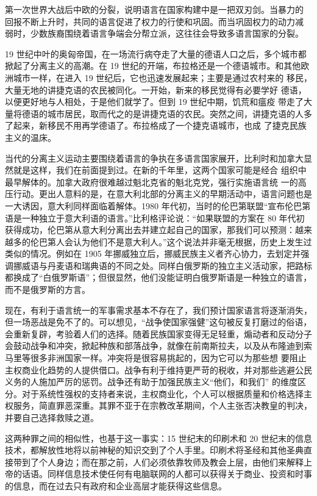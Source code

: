 第一次世界大战后中欧的分裂，说明语言在国家构建中是一把双刃剑。当暴力的 回报不断上升时，共同的语言促进了权力的行使和巩固。而当巩固权力的动力减 弱时，少数族裔围绕着语言争端会分帮立派，这往往会导致多语言国家的分裂。

19 世纪中叶的奥匈帝国，在一场流行病夺走了大量的德语人口之后，多个城市都掀起了分离主义的高潮。在 19 世纪的开端，布拉格还是一个德语城市。和其他欧洲城市一样，在进入 19 世纪后，它也迅速发展起来；主要是通过农村来的 移民，大量无地的讲捷克语的农民被同化。一开始，新来的移民觉得有必要学好 德语，以便更好地与人相处，于是他们就学了。但到 19 世纪中期，饥荒和瘟疫 带走了大量将德语的城市居民，取而代之的是讲捷克语的农民。突然之间，讲捷克语的人多了起来，新移民不用再学德语了。布拉格成了一个捷克语城市，也成 了捷克民族主义的温床。

当代的分离主义运动主要围绕着语言的争执在多语言国家展开，比利时和加拿大显然就是这样，我们在前面提到过。在新的千年里，这两个国家可能是经合 组织中最早解体的。加拿大政府很难越过魁北克省的魁北克党，强行实施语言统 一的高压行动。更出人意料的是，在意大利北部的分离主义的早期活动中，语言问题也是一大诱因，意大利同样面临着解体。1980 年代初，当时的伦巴第联盟“宣布伦巴第语是一种独立于意大利语的语言。”比利格评论说：“如果联盟的方案在 80 年代初获得成功，伦巴第从意大利分离出去并建立起自己的国家，那我们可以预测：越来越多的伦巴第人会认为他们不是意大利人。”这个说法并非毫无根据，历史上发生过类似的情况。例如在 1905 年挪威独立后，挪威民族主义者齐心协力，去划定并强调挪威语与丹麦语和瑞典语的不同之处。同样白俄罗斯的独立主义活动家，把路标都换成了“白俄罗斯语”；但很显然，他们没能证明白俄罗斯语是一种独立的语言，而不是俄罗斯的方言。

现在，有利于语言统一的军事需求基本不存在了，我们预计国家语言将逐渐消失，但一场恶战是免不了的。可以想见，“战争使国家强健”这句被反复打磨过的俗语，会重新复辟，考验着人们的选择。随着民族国家变得无足轻重，煽动者和反动分子会鼓动战争和冲突，掀起种族和部落战争，就像在前南斯拉夫，以及从布隆迪到索马里等很多非洲国家一样。冲突将是很容易挑起的，因为它可以为那些想 要阻止主权商业化趋势的人提供借口。战争有利于维持更严苛的税收，并对那些逃避公民义务的人施加严厉的惩罚。战争还有助于加强民族主义“他们，和我们” 的维度区分。对于系统性强权的支持者来说，主权商业化，个人可以根据质量和价格选择主权服务，简直罪恶深重。其罪不亚于在宗教改革期间，个人主张否决教皇的判决，并要自己选择救赎之道。

这两种罪之间的相似性，也基于这一事实：15 世纪末的印刷术和 20 世纪末的信息技术，都解放性地将以前神秘的知识交到了个人手里。印刷术将圣经和其他圣典直接带到了个人身边；而在那之前，人们必须依靠牧师及教会上层，由他们来解释上帝的话语。同样信息技术使任何有电脑联网的人都可以获得关于商业、投资和时事的信息，而在过去只有政府和企业高层才能获得这些信息。


